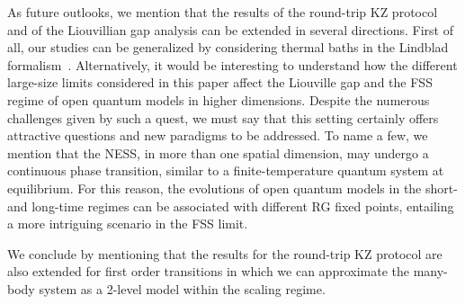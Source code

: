 As future outlooks, we mention that the results of the round-trip KZ protocol and of the Liouvillian gap analysis can be extended in several directions. First of all, our studies can be generalized by considering thermal baths in the Lindblad formalism~\cite{tarantelli2023thermal}. Alternatively, it would be interesting to understand how the different large-size limits considered in this paper affect the Liouville gap and the FSS regime of open quantum models in higher dimensions. Despite the numerous challenges given by such a quest, we must say that this setting certainly offers attractive questions and new paradigms to be addressed. To name a few, we mention that the NESS, in more than one spatial dimension, may undergo a continuous phase transition, similar to a finite-temperature quantum system at equilibrium. For this reason, the evolutions of open quantum models in the short- and long-time regimes can be associated with different RG fixed points, entailing a more intriguing scenario in the FSS limit.

We conclude by mentioning that the results for the round-trip KZ protocol are also extended
for first order transitions \cite{tarantelli2023out} in which we can approximate the 
many-body system as a 2-level model within the scaling regime.



